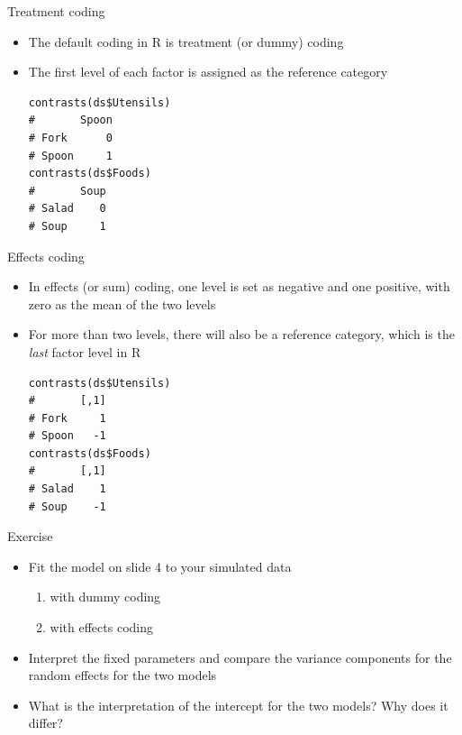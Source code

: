 \documentclass[aspectratio=169]{beamer}
\begin{document}
\begin{frame}[fragile]{Treatment coding}
  \begin{itemize}
    \item The default coding in R is treatment (or dummy) coding
    \item The first level of each factor is assigned as the reference category
\begin{lstlisting}
contrasts(ds$Utensils)
#       Spoon
# Fork      0
# Spoon     1
contrasts(ds$Foods)
#       Soup
# Salad    0
# Soup     1
\end{lstlisting}
  \end{itemize}
\end{frame}

\begin{frame}[fragile]{Effects coding}
  \begin{itemize}
    \item In effects (or sum) coding, one level is set as negative and one
      positive, with zero as the mean of the two levels
    \item For more than two levels, there will also be a reference category,
      which is the \emph{last} factor level in R
\begin{lstlisting}
contrasts(ds$Utensils)
#       [,1]
# Fork     1
# Spoon   -1
contrasts(ds$Foods)
#       [,1]
# Salad    1
# Soup    -1
\end{lstlisting}
  \end{itemize}
\end{frame}

\begin{frame}{}
  \begin{block}{Exercise}
    \begin{itemize}
      \item Fit the model on slide 4 to your simulated data
        \begin{enumerate}
          \item with dummy coding
          \item with effects coding
        \end{enumerate}
      \item Interpret the fixed parameters and compare the variance components
        for the random effects for the two models
      \item What is the interpretation of the intercept for the two models? Why
        does it differ?
    \end{itemize}
  \end{block}
\end{frame}
\end{document}
